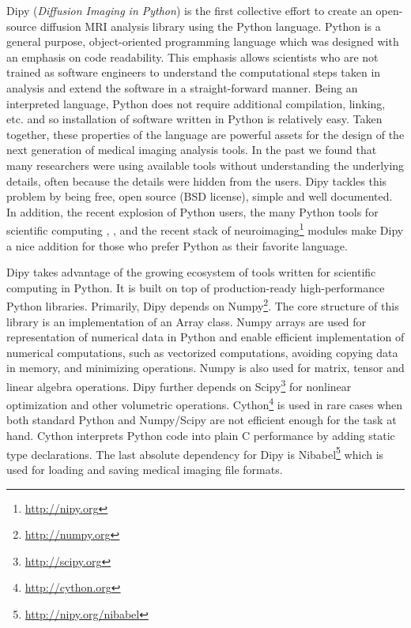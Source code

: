 \documentclass{bioinfo}
\begin{document}
Dipy (\textit{Diffusion Imaging in Python}) is the first collective effort to create an open-source diffusion MRI analysis library using the Python language. Python is a general purpose, object-oriented programming language which was designed with an emphasis on code readability. This emphasis allows scientists who are not trained as software engineers to understand the computational steps taken in analysis and extend the software in a straight-forward manner. Being an interpreted language, Python does not require additional compilation, linking, etc. and so installation of software written in Python is relatively easy. Taken together, these properties of the language are powerful assets for the design of the next generation of medical imaging analysis tools. In the past we found that many researchers were using available tools without understanding the underlying details, often because the details were hidden from the users. Dipy tackles this problem by being free, open source (BSD license), simple and well documented. In addition, the recent explosion of Python users, the many Python tools for scientific computing \citep{perez_python:11}, \citep{mckinney_python:12}, \citep{perez_ipython:07} and the recent stack of neuroimaging\footnote{\url{http://nipy.org}} modules make Dipy a nice addition for those who prefer Python as their favorite language.

Dipy takes advantage of the growing ecosystem of tools written for scientific computing in Python. It is built on top of production-ready high-performance Python libraries. Primarily, Dipy depends on Numpy\footnote{\url{http://numpy.org}}. The core structure of this library is an implementation of an Array \citep{van_numpy:11} class. Numpy arrays are used for representation of numerical data in Python and enable efficient implementation of numerical computations, such as vectorized computations, avoiding copying data in memory, and minimizing operations. Numpy is also used for matrix, tensor and linear algebra operations.  Dipy further depends on Scipy\footnote{\url{http://scipy.org}} for nonlinear optimization and other volumetric operations. Cython\footnote{\url{http://cython.org}} is used in rare cases when both standard Python and Numpy/Scipy are not efficient enough for the task at hand. Cython interprets Python code into plain C performance by adding static type declarations. The last absolute dependency for Dipy is Nibabel\footnote{\url{http://nipy.org/nibabel}} which is used for loading and saving medical imaging file formats.
\end{document}
